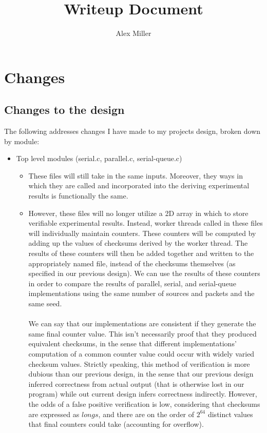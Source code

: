 \documentclass[]{article}
\title{Writeup Document}
\author{Alex Miller}
\begin{document}
\maketitle

\section{Changes}
\subsection{Changes to the design}
The following addresses changes I have made to my projects design, broken down by module:
\begin{itemize}
	\item Top level modules (serial.c, parallel.c, serial-queue.c)
	\begin{itemize}
		\item These files will still take in the same inputs. Moreover, they ways in which they are called and incorporated into the deriving experimental results is functionally the same.
		\item However, these files will no longer utilize a 2D array in which to store verifiable experimental results. Instead, worker threads called in these files will individually maintain counters. These counters will be computed by adding up the values of checksums derived by the worker thread. The results of these counters will then be added together and written to the appropriately named file, instead of the checksums themselves (as specified in our previous design). We can use the results of these counters in order to compare the results of parallel, serial, and serial-queue implementations using the same number of sources and packets and the same seed. 
		\\\\
		We can say that our implementations are consistent if they generate the same final counter value. This isn't necessarily proof that they produced equivalent checksums, in the sense that different implementations' computation of a common counter value could occur with widely varied checksum values. Strictly speaking, this method of verification is more dubious than our previous design, in the sense that our previous design inferred correctness from actual output (that is otherwise lost in our program) while out current design infers correctness indirectly. However, the odds of a false positive verification is low, considering that checksums are expressed as $longs$, and there are on the order of $2^{64}$ distinct values that final counters could take (accounting for overflow).

\end{itemize}
\end{itemize}
\end{document}
